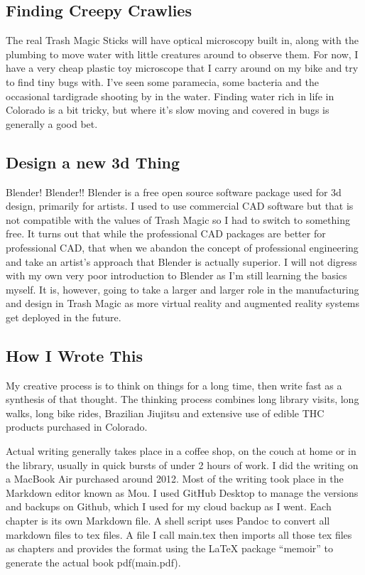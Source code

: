 \subsection{Finding Creepy Crawlies}\label{finding-creepy-crawlies}

The real Trash Magic Sticks will have optical microscopy built in, along
with the plumbing to move water with little creatures around to observe
them. For now, I have a very cheap plastic toy microscope that I carry
around on my bike and try to find tiny bugs with. I've seen some
paramecia, some bacteria and the occasional tardigrade shooting by in
the water. Finding water rich in life in Colorado is a bit tricky, but
where it's slow moving and covered in bugs is generally a good bet.

\subsection{Design a new 3d Thing}\label{design-a-new-3d-thing}

Blender! Blender!! Blender is a free open source software package used
for 3d design, primarily for artists. I used to use commercial CAD
software but that is not compatible with the values of Trash Magic so I
had to switch to something free. It turns out that while the
professional CAD packages are better for professional CAD, that when we
abandon the concept of professional engineering and take an artist's
approach that Blender is actually superior. I will not digress with my
own very poor introduction to Blender as I'm still learning the basics
myself. It is, however, going to take a larger and larger role in the
manufacturing and design in Trash Magic as more virtual reality and
augmented reality systems get deployed in the future.

\subsection{How I Wrote This}\label{how-i-wrote-this}

My creative process is to think on things for a long time, then write
fast as a synthesis of that thought. The thinking process combines long
library visits, long walks, long bike rides, Brazilian Jiujitsu and
extensive use of edible THC products purchased in Colorado.

Actual writing generally takes place in a coffee shop, on the couch at
home or in the library, usually in quick bursts of under 2 hours of
work. I did the writing on a MacBook Air purchased around 2012. Most of
the writing took place in the Markdown editor known as Mou. I used
GitHub Desktop to manage the versions and backups on Github, which I
used for my cloud backup as I went. Each chapter is its own Markdown
file. A shell script uses Pandoc to convert all markdown files to tex
files. A file I call main.tex then imports all those tex files as
chapters and provides the format using the LaTeX package ``memoir'' to
generate the actual book pdf(main.pdf).

